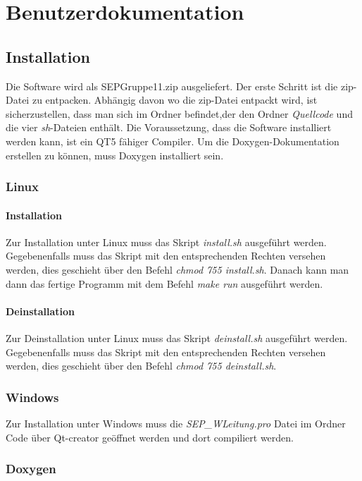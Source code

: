 \chapter{Benutzerdokumentation}

\section{Installation}
Die Software wird als SEPGruppe11.zip ausgeliefert. Der erste Schritt ist die zip-Datei zu entpacken. Abhängig davon wo die zip-Datei entpackt wird, ist sicherzustellen, dass man sich im Ordner befindet,der den Ordner \emph{Quellcode} und die vier \emph{sh}-Dateien enthält.
Die Voraussetzung, dass die Software installiert werden kann, ist ein QT5 fähiger Compiler.
Um die Doxygen-Dokumentation erstellen zu können, muss Doxygen installiert sein.

\subsection{Linux}
\subsubsection{Installation}
Zur Installation unter Linux muss das Skript \emph{install.sh} ausgeführt werden. Gegebenenfalls muss das Skript mit den entsprechenden Rechten versehen werden, dies geschieht über den Befehl \emph{chmod 755 install.sh}. Danach kann man dann das fertige Programm mit dem Befehl \emph{make run} ausgeführt werden.
\subsubsection{Deinstallation}
Zur Deinstallation unter Linux muss das Skript \emph{deinstall.sh} ausgeführt werden. Gegebenenfalls muss das Skript mit den entsprechenden Rechten versehen werden, dies geschieht über den Befehl \emph{chmod 755 deinstall.sh}.

\subsection{Windows}
Zur Installation unter Windows muss die \emph{SEP\_WLeitung.pro} Datei im Ordner Code über Qt-creator geöffnet werden und dort compiliert werden.

\subsection{Doxygen} \label{Installation Doxygen}
